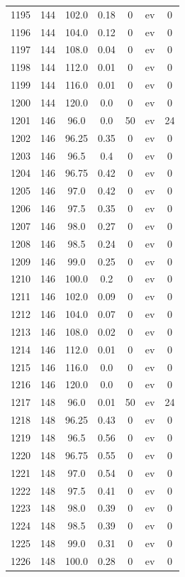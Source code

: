 \documentclass[12pt,a4paper]{article}
\begin{document}
\begin{tabular}{r|cccccc}
	1195 & 144 & 102.0 & 0.18 & 0 & ev & 0 \\
	1196 & 144 & 104.0 & 0.12 & 0 & ev & 0 \\
	1197 & 144 & 108.0 & 0.04 & 0 & ev & 0 \\
	1198 & 144 & 112.0 & 0.01 & 0 & ev & 0 \\
	1199 & 144 & 116.0 & 0.01 & 0 & ev & 0 \\
	1200 & 144 & 120.0 & 0.0 & 0 & ev & 0 \\
	1201 & 146 & 96.0 & 0.0 & 50 & ev & 24 \\
	1202 & 146 & 96.25 & 0.35 & 0 & ev & 0 \\
	1203 & 146 & 96.5 & 0.4 & 0 & ev & 0 \\
	1204 & 146 & 96.75 & 0.42 & 0 & ev & 0 \\
	1205 & 146 & 97.0 & 0.42 & 0 & ev & 0 \\
	1206 & 146 & 97.5 & 0.35 & 0 & ev & 0 \\
	1207 & 146 & 98.0 & 0.27 & 0 & ev & 0 \\
	1208 & 146 & 98.5 & 0.24 & 0 & ev & 0 \\
	1209 & 146 & 99.0 & 0.25 & 0 & ev & 0 \\
	1210 & 146 & 100.0 & 0.2 & 0 & ev & 0 \\
	1211 & 146 & 102.0 & 0.09 & 0 & ev & 0 \\
	1212 & 146 & 104.0 & 0.07 & 0 & ev & 0 \\
	1213 & 146 & 108.0 & 0.02 & 0 & ev & 0 \\
	1214 & 146 & 112.0 & 0.01 & 0 & ev & 0 \\
	1215 & 146 & 116.0 & 0.0 & 0 & ev & 0 \\
	1216 & 146 & 120.0 & 0.0 & 0 & ev & 0 \\
	1217 & 148 & 96.0 & 0.01 & 50 & ev & 24 \\
	1218 & 148 & 96.25 & 0.43 & 0 & ev & 0 \\
	1219 & 148 & 96.5 & 0.56 & 0 & ev & 0 \\
	1220 & 148 & 96.75 & 0.55 & 0 & ev & 0 \\
	1221 & 148 & 97.0 & 0.54 & 0 & ev & 0 \\
	1222 & 148 & 97.5 & 0.41 & 0 & ev & 0 \\
	1223 & 148 & 98.0 & 0.39 & 0 & ev & 0 \\
	1224 & 148 & 98.5 & 0.39 & 0 & ev & 0 \\
	1225 & 148 & 99.0 & 0.31 & 0 & ev & 0 \\
	1226 & 148 & 100.0 & 0.28 & 0 & ev & 0 \\

\end{tabular}
\end{document}
